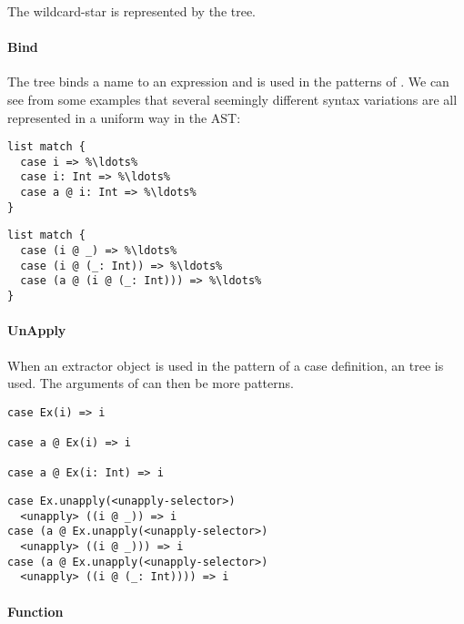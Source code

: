 The wildcard-star is represented by the  tree.

\paragraph{Bind} 

\noindent The  tree binds a name to an expression and is used in the patterns of . We can see from some examples that several seemingly different syntax variations are all represented in a uniform way in the AST:

\begin{multicols}{2}
\begin{lstlisting}
list match {
  case i => %\ldots%
  case i: Int => %\ldots%
  case a @ i: Int => %\ldots%
}
\end{lstlisting}
\begin{lstlisting}
list match {
  case (i @ _) => %\ldots%
  case (i @ (_: Int)) => %\ldots%
  case (a @ (i @ (_: Int))) => %\ldots% 
}
\end{lstlisting}
\end{multicols}

\paragraph{UnApply} 

\noindent When an extractor object is used in the pattern of a case definition, an  tree is used. The arguments of  can then be more  patterns.

\begin{multicols}{2}
\begin{lstlisting}
case Ex(i) => i

case a @ Ex(i) => i

case a @ Ex(i: Int) => i

\end{lstlisting}
\begin{lstlisting}
case Ex.unapply(<unapply-selector>) 
  <unapply> ((i @ _)) => i
case (a @ Ex.unapply(<unapply-selector>) 
  <unapply> ((i @ _))) => i
case (a @ Ex.unapply(<unapply-selector>) 
  <unapply> ((i @ (_: Int)))) => i
\end{lstlisting}
\end{multicols}

\paragraph{Function} 

